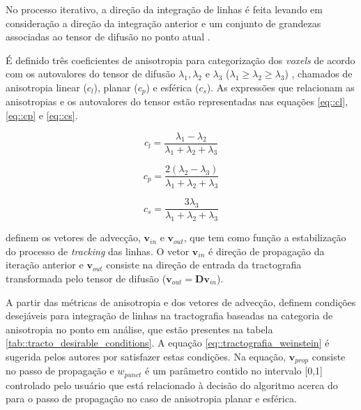 \documentclass[
    12pt,                %
    oneside,            %
    a4paper,            %
    english,            %
    french,                %
    spanish,            %
    brazil                %
    ]{abntex2}
\begin{document}

No processo iterativo, a direção da integração de linhas é feita levando em consideração a direção da integração anterior e um conjunto de grandezas associadas ao tensor de difusão no ponto atual \cite{Weinstein1999}.


É definido três coeficientes de anisotropia para categorização dos \textit{voxels} de acordo com os autovalores do tensor de difusão $\lambda_1, \lambda_2$ e $\lambda_3$ ($\lambda_1 \geq \lambda_2 \geq \lambda_3$) , chamados de anisotropia linear ($c_l$), planar ($c_p$) e esférica ($c_s$). As expressões que relacionam as anisotropias e os autovalores do tensor estão representadas nas equações \ref{eq::cl}, \ref{eq::cp} e \ref{eq::cs}.

\begin{equation}
\label{eq::cl}
    c_l = \frac{\lambda_1 - \lambda_2}{\lambda_1 + \lambda_2 + \lambda_3}
\end{equation}

\begin{equation}
\label{eq::cp}
    c_p = \frac{2(\lambda_2 - \lambda_3)}{\lambda_1 + \lambda_2 + \lambda_3}
\end{equation}

\begin{equation}
\label{eq::cs}
    c_s = \frac{3\lambda_3}{\lambda_1 + \lambda_2 + \lambda_3}
\end{equation}

 definem os vetores de advecção, $\mathbf{v}_{in}$ e $\mathbf{v}_{out}$, que tem como função a estabilização do processo de \textit{tracking} das linhas. O vetor $\mathbf{v}_{in}$ é direção de propagação da iteração anterior e $\mathbf{v}_{out}$  consiste na direção de entrada da tractografia transformada pelo tensor de difusão ($\mathbf{v}_{out} = \mathbf{D}\mathbf{v}_{in}$).

A partir das métricas de anisotropia e dos vetores de advecção,  definem condições desejáveis para integração de linhas na tractografia baseadas na categoria de anisotropia no ponto em análise, que estão presentes na tabela \ref{tab::tracto_desirable_conditions}. A equação \ref{eq::tractografia_weinstein} é sugerida pelos autores por satisfazer estas condições. Na equação, $\textbf{v}_{prop}$ consiste no passo de propagação e $w_{punct}$ é um parâmetro contido no intervalo [0,1] controlado pelo usuário que está relacionado à decisão do algoritmo acerca do  para o passo de propagação no caso de anisotropia planar e esférica.
\end{document}
